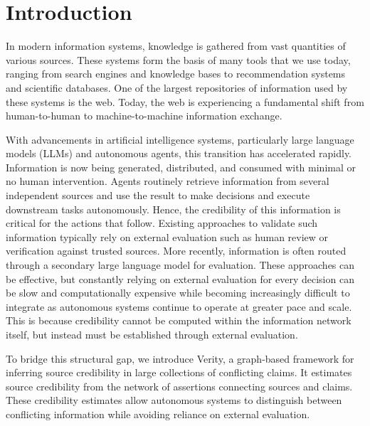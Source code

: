 \section{Introduction}

In modern information systems, knowledge is gathered from vast quantities of various sources. These systems form the basis of many tools that we use today, ranging from search engines and knowledge bases to recommendation systems and scientific databases. One of the largest repositories of information used by these systems is the web. Today, the web is experiencing a fundamental shift from human-to-human to machine-to-machine information exchange.

With advancements in artificial intelligence systems, particularly large language models (LLMs) and autonomous agents, this transition has accelerated rapidly. Information is now being generated, distributed, and consumed with minimal or no human intervention. Agents routinely retrieve information from several independent sources and use the result to make decisions and execute downstream tasks autonomously. Hence, the credibility of this information is critical for the actions that follow. Existing approaches to validate such information typically rely on external evaluation such as human review or verification against trusted sources. More recently, information is often routed through a secondary large language model for evaluation. These approaches can be effective, but constantly relying on external evaluation for every decision can be slow and computationally expensive while becoming increasingly difficult to integrate as autonomous systems continue to operate at greater pace and scale. This is because credibility cannot be computed within the information network itself, but instead must be established through external evaluation.

To bridge this structural gap, we introduce Verity, a graph-based framework for inferring source credibility in large collections of conflicting claims. It estimates source credibility from the network of assertions connecting sources and claims. These credibility estimates allow autonomous systems to distinguish between conflicting information while avoiding reliance on external evaluation.
